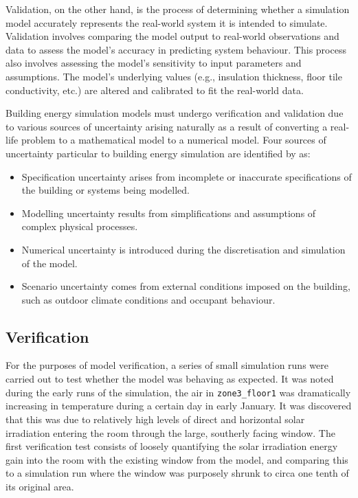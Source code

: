 Validation, on the other hand, is the process of determining whether a simulation model accurately represents the real-world system it is intended to simulate. Validation involves comparing the model output to real-world observations and data to assess the model's accuracy in predicting system behaviour. This process also involves assessing the model's sensitivity to input parameters and assumptions. The model's underlying values (e.g., insulation thickness, floor tile conductivity, etc.) are altered and calibrated to fit the real-world data.

Building energy simulation models must undergo verification and validation due to various sources of uncertainty arising naturally as a result of converting a real-life problem to a mathematical model to a numerical model. Four sources of uncertainty particular to building energy simulation are identified by \cite{coakley_review_2014,DEWIT2002951} as: 
\begin{itemize}
    \item Specification uncertainty arises from incomplete or inaccurate specifications of the building or systems being modelled. 
    \item Modelling uncertainty results from simplifications and assumptions of complex physical processes. 
    \item Numerical uncertainty is introduced during the discretisation and simulation of the model. 
    \item Scenario uncertainty comes from external conditions imposed on the building, such as outdoor climate conditions and occupant behaviour.
\end{itemize}

\subsection{Verification}
For the purposes of model verification, a series of small simulation runs were carried out to test whether the model was behaving as expected. It was noted during the early runs of the simulation, the air in \texttt{zone3\_floor1} was dramatically increasing in temperature during a certain day in early January. It was discovered that this was due to relatively high levels of direct and horizontal solar irradiation entering the room through the large, southerly facing window. The first verification test consists of loosely quantifying the solar irradiation energy gain into the room with the existing window from the model, and comparing this to a simulation run where the window was purposely shrunk to circa one tenth of its original area. 

